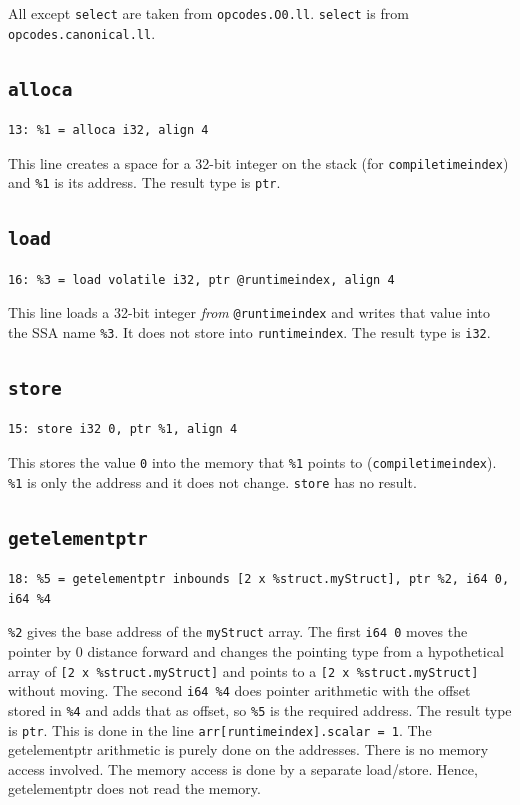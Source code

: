 \documentclass[11pt,a4paper]{article}
\begin{document}
All except \texttt{select} are taken from \texttt{opcodes.O0.ll}.
\texttt{select} is from \texttt{opcodes.canonical.ll}.

\subsection*{\texttt{alloca}}

\begin{lstlisting}
13: %1 = alloca i32, align 4
\end{lstlisting}

This line creates a space for a 32-bit integer on the stack (for
\texttt{compiletimeindex}) and \texttt{\%1} is its address. The result type is
\texttt{ptr}.

\subsection*{\texttt{load}}

\begin{lstlisting}
16: %3 = load volatile i32, ptr @runtimeindex, align 4
\end{lstlisting}

This line loads a 32-bit integer \emph{from} \texttt{@runtimeindex} and writes
that value into the SSA name \texttt{\%3}. It does not store into
\texttt{runtimeindex}. The result type is \texttt{i32}.

\subsection*{\texttt{store}}

\begin{lstlisting}
15: store i32 0, ptr %1, align 4
\end{lstlisting}

This stores the value \texttt{0} into the memory that \texttt{\%1} points to
(\texttt{compiletimeindex}). \texttt{\%1} is only the address and it does not
change. \texttt{store} has no result.

\subsection*{\texttt{getelementptr}}

\begin{lstlisting}
18: %5 = getelementptr inbounds [2 x %struct.myStruct], ptr %2, i64 0, i64 %4
\end{lstlisting}

\texttt{\%2} gives the base address of the \texttt{myStruct} array. The first
\texttt{i64 0} moves the pointer by 0 distance forward and changes the pointing
type from a hypothetical array of \texttt{[2 x \%struct.myStruct]} and points to a
\texttt{[2 x \%struct.myStruct]} without moving. The second \texttt{i64 \%4} does pointer
arithmetic with the offset stored in \texttt{\%4} and adds that as offset, so
\texttt{\%5} is the required address. The result type is \texttt{ptr}. This is done in
the line \texttt{arr[runtimeindex].scalar = 1}.
The getelementptr arithmetic is purely done on the addresses. There is no memory access involved. The memory access is done by a separate load/store. Hence, getelementptr does not read the memory.
\end{document}
